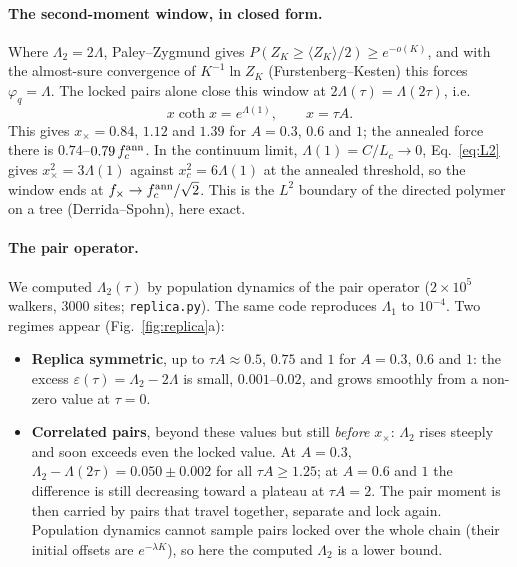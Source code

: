 \documentclass[10pt,a4paper]{article}
\begin{document}
\paragraph{The second-moment window, in closed form.}
Where $\Lambda_2=2\Lambda$, Paley--Zygmund gives $P(Z_K\ge\langle Z_K\rangle/2)\ge e^{-o(K)}$, and with the almost-sure convergence of $K^{-1}\ln Z_K$ (Furstenberg--Kesten) this forces $\varphi_q=\Lambda$.
The locked pairs alone close this window at $2\Lambda(\tau)=\Lambda(2\tau)$, i.e.
\begin{equation}
x\coth x=e^{\Lambda(1)},\qquad x=\tau A .
\label{eq:L2}
\end{equation}
This gives $x_\times=0.84$, $1.12$ and $1.39$ for $A=0.3$, $0.6$ and $1$; the annealed force there is $0.74$--$0.79\,f_c^{\rm ann}$.
In the continuum limit, $\Lambda(1)=C/L_c\to0$, Eq.~\eqref{eq:L2} gives $x_\times^2=3\Lambda(1)$ against $x_c^2=6\Lambda(1)$ at the annealed threshold, so the window ends at $f_\times\to f_c^{\rm ann}/\sqrt2$. This is the $L^2$ boundary of the directed polymer on a tree (Derrida--Spohn), here exact.

\paragraph{The pair operator.}
We computed $\Lambda_2(\tau)$ by population dynamics of the pair operator ($2\times10^5$ walkers, $3000$ sites; \texttt{replica.py}). The same code reproduces $\Lambda_1$ to $10^{-4}$. Two regimes appear (Fig.~\ref{fig:replica}a):
\begin{itemize}
\item \textbf{Replica symmetric}, up to $\tau A\approx0.5$, $0.75$ and $1$ for $A=0.3$, $0.6$ and $1$: the excess $\varepsilon(\tau)=\Lambda_2-2\Lambda$ is small, $0.001$--$0.02$, and grows smoothly from a non-zero value at $\tau=0$.
\item \textbf{Correlated pairs}, beyond these values but still \emph{before} $x_\times$: $\Lambda_2$ rises steeply and soon exceeds even the locked value. At $A=0.3$, $\Lambda_2-\Lambda(2\tau)=0.050\pm0.002$ for all $\tau A\ge1.25$; at $A=0.6$ and $1$ the difference is still decreasing toward a plateau at $\tau A=2$. The pair moment is then carried by pairs that travel together, separate and lock again. Population dynamics cannot sample pairs locked over the whole chain (their initial offsets are $e^{-\lambda K}$), so here the computed $\Lambda_2$ is a lower bound.
\end{itemize}
\end{document}
